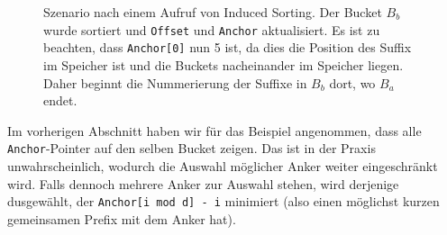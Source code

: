 \begin{figure}[!h]
\centering
{}
\caption{Szenario nach einem Aufruf von Induced Sorting. Der Bucket $B_b$ wurde sortiert und \texttt{Offset} und \texttt{Anchor} aktualisiert. Es ist zu beachten, dass \texttt{Anchor[0]} nun 5 ist, da dies die Position des Suffix im Speicher ist und die Buckets nacheinander im Speicher liegen. Daher beginnt die Nummerierung der Suffixe in $B_b$ dort, wo $B_a$ endet.}
\label{fg:beispiel2}
\end{figure}

Im vorherigen Abschnitt haben wir für das Beispiel angenommen, dass alle \texttt{Anchor}-Pointer auf den selben Bucket zeigen.
Das ist in der Praxis unwahrscheinlich, wodurch die Auswahl möglicher Anker weiter eingeschränkt wird.
Falls dennoch mehrere Anker zur Auswahl stehen, wird derjenige dusgewählt, der \texttt{Anchor[i mod d] - i} minimiert (also einen möglichst kurzen gemeinsamen Prefix mit dem Anker hat).

